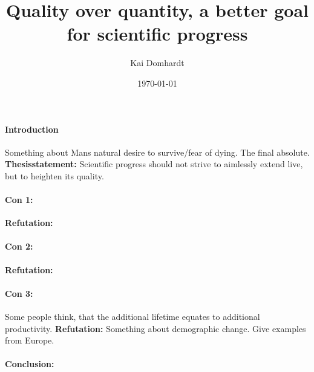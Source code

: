 \documentclass[12pt]{scrartcl}
\title{Quality over quantity, a better goal for scientific progress}
\author{Kai Domhardt}
\date{\today}
\begin{document}
\maketitle

\paragraph{Introduction}
Something about Mans natural desire to survive/fear of dying. The final absolute.
\textbf{Thesisstatement:}
Scientific progress should not strive to aimlessly extend live, but to heighten its quality.

\paragraph{Con 1:}
\textbf{Refutation:}

\paragraph{Con 2:}
\textbf{Refutation:}

\paragraph{Con 3:}
Some people think, that the additional lifetime equates to additional productivity.
\textbf{Refutation:}
Something about demographic change. Give examples from Europe.

\paragraph{Conclusion:}
\end{document}
